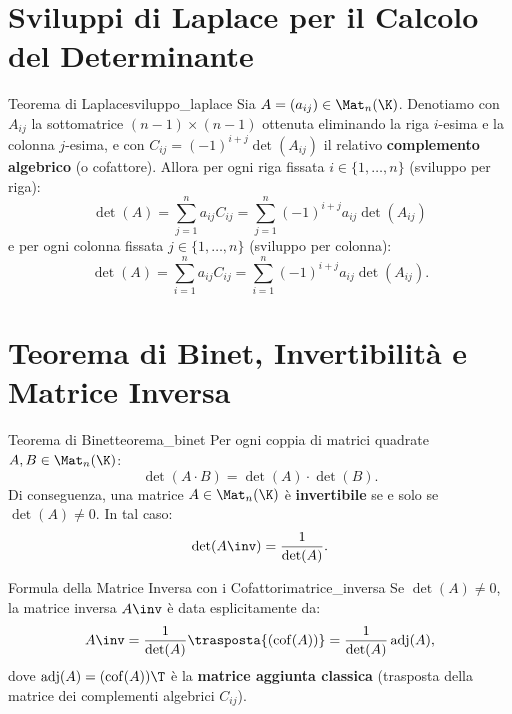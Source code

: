\section{Sviluppi di Laplace per il Calcolo del Determinante}

\begin{teorema}{Teorema di Laplace}{sviluppo_laplace}
Sia $A = (a_{ij}) \in \Mat_n(\K)$. Denotiamo con $A_{ij}$ la sottomatrice $(n-1) \times (n-1)$ ottenuta eliminando la riga $i$-esima e la colonna $j$-esima, e con $C_{ij} = (-1)^{i+j} \det(A_{ij})$ il relativo \textbf{complemento algebrico} (o cofattore).
Allora per ogni riga fissata $i \in \{1, \dots, n\}$ (sviluppo per riga):
\begin{equation}
    \det(A) = \sum_{j=1}^n a_{ij} C_{ij} = \sum_{j=1}^n (-1)^{i+j} a_{ij} \det(A_{ij})
\end{equation}
e per ogni colonna fissata $j \in \{1, \dots, n\}$ (sviluppo per colonna):
\begin{equation}
    \det(A) = \sum_{i=1}^n a_{ij} C_{ij} = \sum_{i=1}^n (-1)^{i+j} a_{ij} \det(A_{ij}).
\end{equation}
\end{teorema}

\section{Teorema di Binet, Invertibilità e Matrice Inversa}

\begin{teorema}{Teorema di Binet}{teorema_binet}
Per ogni coppia di matrici quadrate $A, B \in \Mat_n(\K)$:
\begin{equation}
    \det(A \cdot B) = \det(A) \cdot \det(B).
\end{equation}
Di conseguenza, una matrice $A \in \Mat_n(\K)$ è \textbf{invertibile} se e solo se $\det(A) \neq 0$. In tal caso:
\begin{equation}
    \det(A\inv) = \frac{1}{\det(A)}.
\end{equation}
\end{teorema}

\begin{teorema}{Formula della Matrice Inversa con i Cofattori}{matrice_inversa}
Se $\det(A) \neq 0$, la matrice inversa $A\inv$ è data esplicitamente da:
\begin{equation}
    A\inv = \frac{1}{\det(A)} \trasposta{(\operatorname{cof}(A))} = \frac{1}{\det(A)} \operatorname{adj}(A),
\end{equation}
dove $\operatorname{adj}(A) = (\operatorname{cof}(A))\T$ è la \textbf{matrice aggiunta classica} (trasposta della matrice dei complementi algebrici $C_{ij}$).
\end{teorema}

